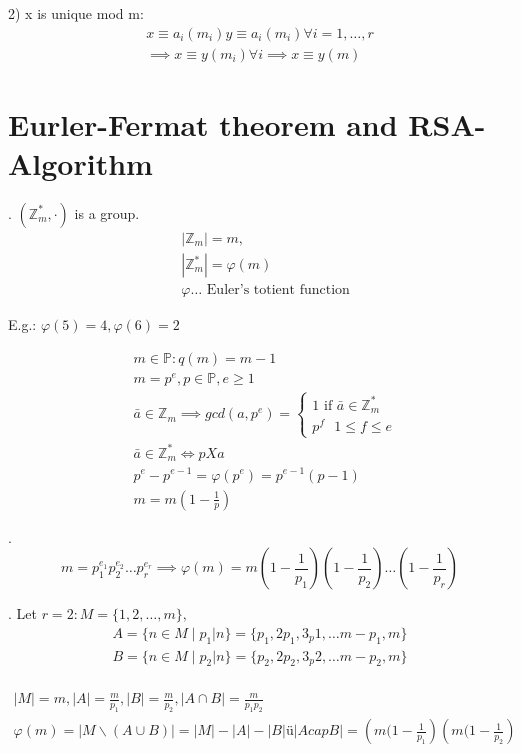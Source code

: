 2) x is unique mod m:
\begin{align*}
  x \equiv a_i(m_i) y \equiv a_i (m_i) \forall i = 1,\ldots, r \\
  \implies x \equiv y (m_i) \forall i \implies x\equiv y (m)
\end{align*}

\section{Eurler-Fermat theorem and RSA-Algorithm}

\Theorem.
$(\mathbb{Z}_m^{*}, \cdot)$ is a group.
\begin{align*}
  &|\mathbb{Z}_m| = m, \\
  &|\mathbb{Z}_m^{*}| = \varphi(m) \\
  &\varphi \ldots \text{ Euler's totient function}
\end{align*}

E.g.: $\varphi(5) = 4, \varphi(6) = 2$

\begin{align*}
  &m \in \mathbb{P}: q(m) = m-1 \\
  &m = p^e, p \in \mathbb{P}, e \geq 1 \\
  &\bar{a}\in \mathbb{Z}_m \implies gcd(a,p^e) = \begin{cases}
    1 \text{ if $\bar{a} \in \mathbb{Z}_m^{*}$} \\
    p^f \text{ $1 \leq f \leq e$} 
  \end{cases} \\
  &\bar{a}\in \mathbb{Z}_m^{*} \Leftrightarrow p X a \\
  & p^e - p^{e-1} = \varphi(p^e) = p^{e-1}(p-1) \\
  & m = m\left(1-\frac{1}{p}\right) 
\end{align*}

\Theorem.
\[
  m = p_1^{e_1} p_2^{e_2} \ldots p_r^{e_r} \implies
  \varphi(m) = m \left( 1-\frac{1}{p_1} \right) \left( 1-\frac{1}{p_2} \right) \ldots \left( 1-\frac{1}{p_r} \right)
\]

\Proof.
Let $r=2: M = \{1,2, \ldots, m\},$ 
\begin{align*}
  A = \{ n \in M \mid p_1|n\} = \{p_1, 2p_1, 3_p1, \ldots m-p_1, m\} \\
  B = \{ n \in M \mid p_2|n\} = \{p_2, 2p_2, 3_p2, \ldots m-p_2, m\} \\
\end{align*}

\begin{align*}
  |M| = m, |A| = \frac{m}{p_1}, |B| = \frac{m}{p_2}, 
  |A \cap B| = \frac{m}{p_1p_2}\\
  \varphi(m) = | M \backslash(A\cup B) | = |M| - |A| - |B| ü | A cap B| 
    = \left(m (1- \frac{1}{p_1} \right) \left(m (1- \frac{1}{p_2} \right)
\end{align*}

